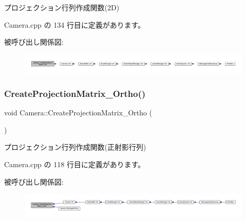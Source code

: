 プロジェクション行列作成関数(2\+D) 



 Camera.\+cpp の 134 行目に定義があります。

被呼び出し関係図\+:
\nopagebreak
\begin{figure}[H]
\begin{center}
\leavevmode
\includegraphics[width=350pt]{class_camera_aaae8043a952b7675d209bdc9b80bcc3f_icgraph}
\end{center}
\end{figure}
\mbox{\label{class_camera_a215010fc78cb35ed588ac9676c166f64}} 
\subsubsection{\texorpdfstring{Create\+Projection\+Matrix\+\_\+\+Ortho()}{CreateProjectionMatrix\_Ortho()}}
{\footnotesize\ttfamily void Camera\+::\+Create\+Projection\+Matrix\+\_\+\+Ortho (\begin{DoxyParamCaption}{ }\end{DoxyParamCaption})}



プロジェクション行列作成関数(正射影行列) 



 Camera.\+cpp の 118 行目に定義があります。

被呼び出し関係図\+:
\nopagebreak
\begin{figure}[H]
\begin{center}
\leavevmode
\includegraphics[width=350pt]{class_camera_a215010fc78cb35ed588ac9676c166f64_icgraph}
\end{center}
\end{figure}
\mbox{\label{class_camera_a1786fe1adbe95e2ffa2de4cdb114546a}} 
